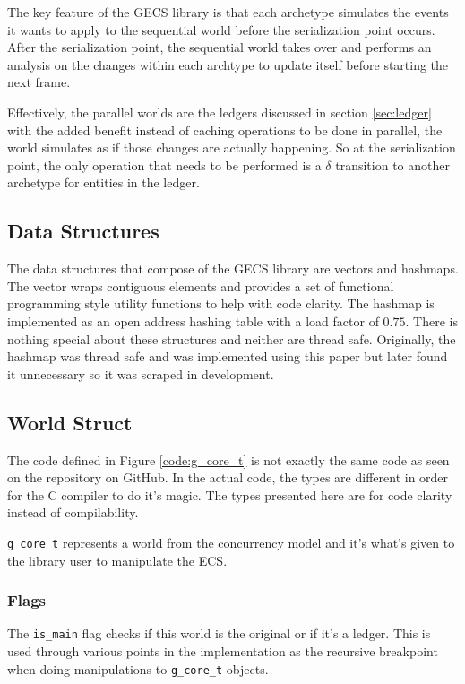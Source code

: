 The key feature of the GECS library is that each archetype simulates the events it wants to apply to the sequential world before the serialization point occurs. After the serialization point, the sequential world takes over and performs an analysis on the changes within each archtype to update itself before starting the next frame.

Effectively, the parallel worlds are the ledgers discussed in section \ref{sec:ledger} with the added benefit instead of caching operations to be done in parallel, the world simulates as if those changes are actually happening. So at the serialization point, the only operation that needs to be performed is a $\delta$ transition to another archetype for entities in the ledger.

\subsection{Data Structures}
The data structures that compose of the GECS library are vectors and hashmaps. The vector wraps contiguous elements and provides a set of functional programming style utility functions to help with code clarity. The hashmap is implemented as an open address hashing table with a load factor of $0.75$. There is nothing special about these structures and neither are thread safe. Originally, the hashmap was thread safe and was implemented using this paper \cite{hashmaps} but later found it unnecessary so it was scraped in development. 

\subsection{World Struct}
The code defined in Figure \ref{code:g_core_t} is not exactly the same code as seen on the repository on GitHub. In the actual code, the types are different in order for the C compiler to do it's magic. The types presented here are for code clarity instead of compilability.

\texttt{g\_core\_t} represents a world from the concurrency model and it's what's given to the library user to manipulate the ECS.

\subsubsection{Flags}
The \texttt{is\_main} flag checks if this world is the original or if it's a ledger. This is used through various points in the implementation as the recursive breakpoint when doing manipulations to \texttt{g\_core\_t} objects. 

